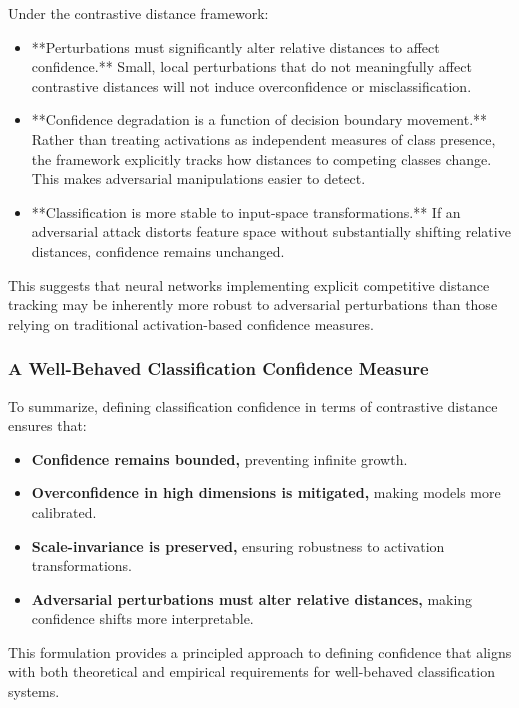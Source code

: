 \documentclass[12pt]{article}
\begin{document}
Under the contrastive distance framework:

\begin{itemize}
    \item **Perturbations must significantly alter relative distances to affect confidence.** Small, local perturbations that do not meaningfully affect contrastive distances will not induce overconfidence or misclassification.
    \item **Confidence degradation is a function of decision boundary movement.** Rather than treating activations as independent measures of class presence, the framework explicitly tracks how distances to competing classes change. This makes adversarial manipulations easier to detect.
    \item **Classification is more stable to input-space transformations.** If an adversarial attack distorts feature space without substantially shifting relative distances, confidence remains unchanged.
\end{itemize}

This suggests that neural networks implementing explicit competitive distance tracking may be inherently more robust to adversarial perturbations than those relying on traditional activation-based confidence measures.

\subsubsection{A Well-Behaved Classification Confidence Measure}

To summarize, defining classification confidence in terms of contrastive distance ensures that:

\begin{itemize}
    \item \textbf{Confidence remains bounded,} preventing infinite growth.
    \item \textbf{Overconfidence in high dimensions is mitigated,} making models more calibrated.
    \item \textbf{Scale-invariance is preserved,} ensuring robustness to activation transformations.
    \item \textbf{Adversarial perturbations must alter relative distances,} making confidence shifts more interpretable.
\end{itemize}

This formulation provides a principled approach to defining confidence that aligns with both theoretical and empirical requirements for well-behaved classification systems.
\end{document}
